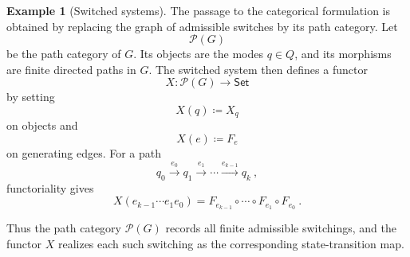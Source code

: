 \documentclass[a4paper,reqno,oneside]{amsart}
\theoremstyle{definition}
\newtheorem{example}[theorem]{Example}
\theoremstyle{remark}
\numberwithin{equation}{section}
\begin{document}
\begin{example}[Switched systems]
		The passage to the categorical formulation is obtained by replacing the
		graph of admissible switches by its path category. Let
		\begin{equation}
			\mathcal P(G)
		\end{equation}
		be the path category of $G$. Its objects are the modes $q\in Q$, and its
		morphisms are finite directed paths in $G$. The switched system then defines
		a functor
		\begin{equation}
			X\colon \mathcal P(G)\longrightarrow \mathsf{Set}
		\end{equation}
		by setting
		\begin{equation}
			X(q)\coloneqq X_q
		\end{equation}
		on objects and
		\begin{equation}
			X(e)\coloneqq F_e
		\end{equation}
		on generating edges. For a path
		\begin{equation}
			q_0\xrightarrow{e_0}q_1\xrightarrow{e_1}\cdots
			\xrightarrow{e_{k-1}}q_k \ ,
		\end{equation}
		functoriality gives
		\begin{equation}
			X(e_{k-1}\cdots e_1e_0)
			=
			F_{e_{k-1}}\circ\cdots\circ F_{e_1}\circ F_{e_0} \ .
		\end{equation}
		
		Thus the path category $\mathcal P(G)$ records all finite admissible switchings, and the functor $X$ realizes each such switching as the
		corresponding state-transition map.
	\end{example}
	
	
	
\end{document}
